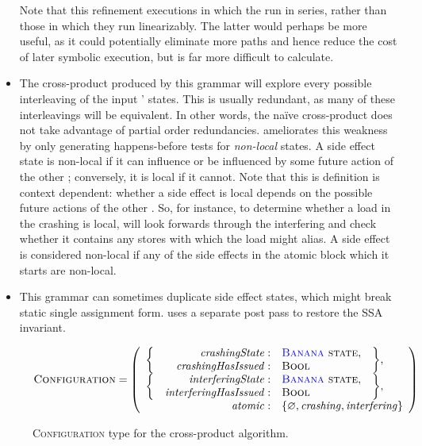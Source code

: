 \begin{itemize}
  Note that this refinement executions in which the {\StateMachines}
  run in series, rather than those in which they run linearizably.
  The latter would perhaps be more useful, as it could potentially
  eliminate more paths and hence reduce the cost of later symbolic
  execution, but is far more difficult to calculate.
\item The cross-product {\StateMachine} produced by this grammar will
  explore every possible interleaving of the input {\StateMachines}'
  states.  This is usually redundant, as many of these interleavings
  will be equivalent.  In other words, the na\"ive
  cross-product does not take advantage of partial order redundancies.
  {\Technique} ameliorates this weakness by only generating
  happens-before tests for \emph{non-local} states.  A side effect
  state is non-local if it can influence or be influenced by some
  future action of the other {\StateMachine}; conversely, it is local
  if it cannot.  Note that this is definition is context dependent:
  whether a side effect is local depends on the possible future
  actions of the other {\StateMachine}.  So, for
  instance, to determine whether a load in the crashing
  {\StateMachine} is local, {\technique} will look forwards through
  the interfering {\StateMachine} and check whether it contains any
  stores with which the load might alias.  A {\stStartAtomic} side
  effect is considered non-local if any of the side effects in the
  atomic block which it starts are non-local.
\item This grammar can sometimes duplicate side effect states, which
  might break static single assignment form.  {\Technique} uses a
  separate post pass to restore the SSA invariant.
\end{itemize}
\begin{figure}
  \begin{displaymath}
    \textsc{Configuration} = \left(\begin{array}{rrll}
      \multirow{2}{*}{\bigg\{} & \mathit{crashingState}: & \textsc{{\STateMachine} state}, & \multirow{2}{*}{\bigg\},}\\
                               & \mathit{crashingHasIssued}: & \textsc{Bool}\\
      \multirow{2}{*}{\bigg\{} & \mathit{interferingState}: & \textsc{{\STateMachine} state}, & \multirow{2}{*}{\bigg\},} \\
                               & \mathit{interferingHasIssued}: & \textsc{Bool}\\
      \multicolumn{2}{r}{\mathit{atomic}:} & \multicolumn{2}{l}{\{ \varnothing, \mathit{crashing}, \mathit{interfering} \}}
    \end{array}\right)
  \end{displaymath}
  \caption{\textsc{Configuration} type for the cross-product algorithm.}
  \label{fig:cross_product:configuration}
\end{figure}
